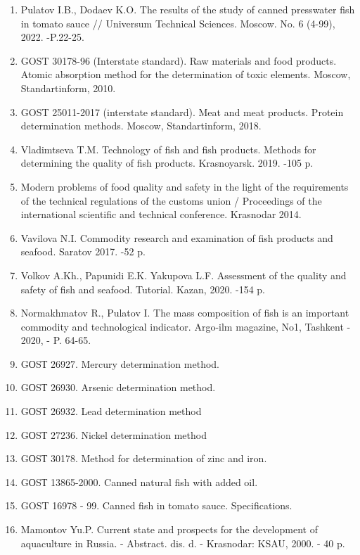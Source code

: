 \begin{enumerate}
\item
Pulatov I.B., Dodaev K.O. The results of the study of canned
presswater fish in tomato sauce // Universum Technical Sciences. Moscow.
No. 6 (4-99), 2022. -P.22-25.

\item
GOST 30178-96 (Interstate standard). Raw materials and food products.
Atomic absorption method for the determination of toxic elements.
Moscow, Standartinform, 2010.

\item
GOST 25011-2017 (interstate standard). Meat and meat products.
Protein determination methods. Moscow, Standartinform, 2018.

\item
Vladimtseva T.M. Technology of fish and fish products. Methods for
determining the quality of fish products. Krasnoyarsk. 2019. -105 p.

\item
Modern problems of food quality and safety in the light of the
requirements of the technical regulations of the customs union /
Proceedings of the international scientific and technical conference.
Krasnodar 2014.

\item
Vavilova N.I. Commodity research and examination of fish products and
seafood. Saratov 2017. -52 p.

\item
Volkov A.Kh., Papunidi E.K. Yakupova L.F. Assessment of the quality
and safety of fish and seafood. Tutorial. Kazan, 2020. -154 p.

\item
Normakhmatov R., Pulatov I. The mass composition of fish is an
important commodity and technological indicator. Argo-ilm magazine, No1,
Tashkent - 2020, - P. 64-65.

\item
GОSТ 26927. Mercury determination method.

\item
GОSТ 26930. Arsenic determination method.

\item
GОSТ 26932. Lead determination method

\item
GОSТ 27236. Nickel determination method

\item
GОSТ 30178. Method for determination of zinc and iron.

\item
GОSТ 13865-2000. Canned natural fish with added oil.

\item
GOST 16978 - 99. Canned fish in tomato sauce. Specifications.

\item
Mamontov Yu.P. Current state and prospects for the development of
aquaculture in Russia. - Abstract. dis. d. - Krasnodar: KSAU, 2000. - 40
p.
\end{enumerate}

